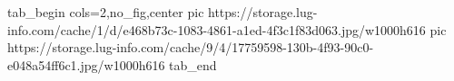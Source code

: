  
 
 
 
 


\ifcmt
  tab_begin cols=2,no_fig,center
     pic https://storage.lug-info.com/cache/1/d/e468b73c-1083-4861-a1ed-4f3c1f83d063.jpg/w1000h616
     pic https://storage.lug-info.com/cache/9/4/17759598-130b-4f93-90c0-e048a54ff6c1.jpg/w1000h616
  tab_end
\fi
